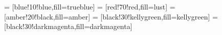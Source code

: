 

 = [blue!10!blue,fill=trueblue]
 = [red!70!red,fill=lust]
 = [amber!20!black,fill=amber]
 = [black!30!kellygreen,fill=kellygreen]
 = [black!30!darkmagenta,fill=darkmagenta]
